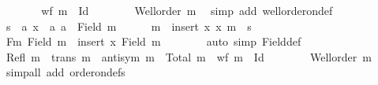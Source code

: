 \begin{isabellebody}
\ \ \ \ \isamarkupfalse%
\ \isamarkupfalse%
\ {\isachardoublequoteopen}wf\ {\isacharparenleft}{\kern0pt}m\ {\isacharminus}{\kern0pt}\ Id{\isacharparenright}{\kern0pt}{\isachardoublequoteclose}\isanewline
\ \ \ \ \ \ \isamarkupfalse%
\ {\isacartoucheopen}Well{\isacharunderscore}{\kern0pt}order\ m{\isacartoucheclose}\ \isamarkupfalse%
\ {\isacharparenleft}{\kern0pt}simp\ add{\isacharcolon}{\kern0pt}\ well{\isacharunderscore}{\kern0pt}order{\isacharunderscore}{\kern0pt}on{\isacharunderscore}{\kern0pt}def{\isacharparenright}{\kern0pt}\isanewline
%
\isanewline
\ \ \ \ \isamarkupfalse%
\ {\isacharquery}{\kern0pt}s\ {\isacharequal}{\kern0pt}\ {\isachardoublequoteopen}{\isacharbraceleft}{\kern0pt}{\isacharparenleft}{\kern0pt}a{\isacharcomma}{\kern0pt}\ x{\isacharparenright}{\kern0pt}\ {\isacharbar}{\kern0pt}\ a{\isachardot}{\kern0pt}\ a\ {\isasymin}\ Field\ m{\isacharbraceright}{\kern0pt}{\isachardoublequoteclose}\isanewline
\ \ \ \ \isamarkupfalse%
\ {\isacharquery}{\kern0pt}m\ {\isacharequal}{\kern0pt}\ {\isachardoublequoteopen}insert\ {\isacharparenleft}{\kern0pt}x{\isacharcomma}{\kern0pt}\ x{\isacharparenright}{\kern0pt}\ m\ {\isasymunion}\ {\isacharquery}{\kern0pt}s{\isachardoublequoteclose}\isanewline
\ \ \ \ \isamarkupfalse%
\ Fm{\isacharcolon}{\kern0pt}\ {\isachardoublequoteopen}Field\ {\isacharquery}{\kern0pt}m\ {\isacharequal}{\kern0pt}\ insert\ x\ {\isacharparenleft}{\kern0pt}Field\ m{\isacharparenright}{\kern0pt}{\isachardoublequoteclose}\isanewline
\ \ \ \ \ \ \isamarkupfalse%
\ {\isacharparenleft}{\kern0pt}auto\ simp{\isacharcolon}{\kern0pt}\ Field{\isacharunderscore}{\kern0pt}def{\isacharparenright}{\kern0pt}\isanewline
\ \ \ \ \isamarkupfalse%
\ {\isachardoublequoteopen}Refl\ m{\isachardoublequoteclose}\ \ {\isachardoublequoteopen}trans\ m{\isachardoublequoteclose}\ \ {\isachardoublequoteopen}antisym\ m{\isachardoublequoteclose}\ \ {\isachardoublequoteopen}Total\ m{\isachardoublequoteclose}\ \ {\isachardoublequoteopen}wf\ {\isacharparenleft}{\kern0pt}m\ {\isacharminus}{\kern0pt}\ Id{\isacharparenright}{\kern0pt}{\isachardoublequoteclose}\isanewline
\ \ \ \ \ \ \isamarkupfalse%
\ {\isacartoucheopen}Well{\isacharunderscore}{\kern0pt}order\ m{\isacartoucheclose}\ \isamarkupfalse%
\ {\isacharparenleft}{\kern0pt}simp{\isacharunderscore}{\kern0pt}all\ add{\isacharcolon}{\kern0pt}\ order{\isacharunderscore}{\kern0pt}on{\isacharunderscore}{\kern0pt}defs{\isacharparenright}{\kern0pt}\isanewline

\end{isabellebody}
